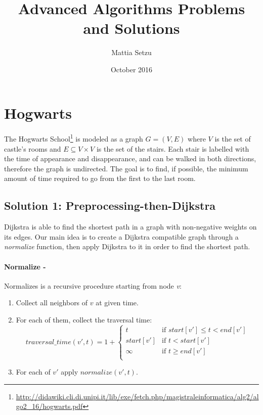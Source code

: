 \documentclass{article}
\title{Advanced Algorithms Problems and Solutions}
\author{Mattia Setzu}
\date{October 2016}
\begin{document}
\maketitle

\tableofcontents
\clearpage

\section{Hogwarts}

The Hogwarts School\footnote{\url{http://didawiki.cli.di.unipi.it/lib/exe/fetch.php/magistraleinformatica/alg2/algo2_16/hogwarts.pdf}} is modeled as a graph $G=(V, E)$ where $V$ is the set of castle's rooms and $E \subseteq V \times V$ is the set of the stairs. Each stair is labelled with the time of appearance and disappearance, and can be walked in both directions, therefore the graph is undirected. The goal is to find, if possible, the minimum amount of time required to go from the first to the last room.

\subsection{Solution 1: Preprocessing-then-Dijkstra}

Dijkstra is able to find the shortest path in a graph with non-negative weights on its edges. Our main idea is to create a Dijkstra compatible graph through a \emph{normalize} function, then apply Dijkstra to it in order to find the shortest path.

\paragraph{Normalize -} Normalizes is a recursive procedure starting from node \emph{v}:
\begin{enumerate}
  \item Collect all neighbors of $v$ at given time.
  \item For each of them, collect the traversal time:
  \begin{equation}
    traversal\_time(v', t) = 1 + \begin{cases}
    t           &   \mbox{if } start[v'] \leq t < end[v']   \\
    start[v']   &   \mbox{if } t < start[v']                \\
    \infty      &   \mbox{if } t \geq end[v']               \\
  \end{cases}
\end{equation}

  \item For each of $v'$ apply $normalize(v', t)$.
\end{enumerate}
\end{document}
